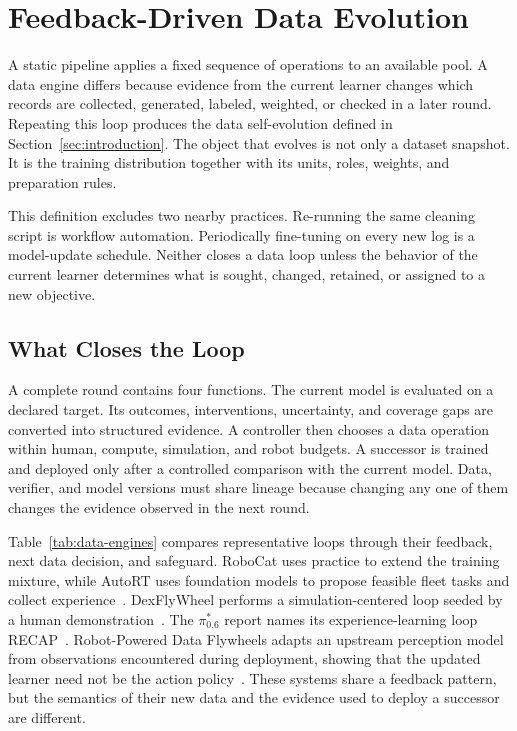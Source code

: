 \section{Feedback-Driven Data Evolution}
\label{sec:data-engines}

A static pipeline applies a fixed sequence of operations to an available pool. A data engine differs because evidence from the current learner changes which records are collected, generated, labeled, weighted, or checked in a later round. Repeating this loop produces the data self-evolution defined in Section~\ref{sec:introduction}. The object that evolves is not only a dataset snapshot. It is the training distribution together with its units, roles, weights, and preparation rules.

This definition excludes two nearby practices. Re-running the same cleaning script is workflow automation. Periodically fine-tuning on every new log is a model-update schedule. Neither closes a data loop unless the behavior of the current learner determines what is sought, changed, retained, or assigned to a new objective.

\subsection{What Closes the Loop}

A complete round contains four functions. The current model is evaluated on a declared target. Its outcomes, interventions, uncertainty, and coverage gaps are converted into structured evidence. A controller then chooses a data operation within human, compute, simulation, and robot budgets. A successor is trained and deployed only after a controlled comparison with the current model. Data, verifier, and model versions must share lineage because changing any one of them changes the evidence observed in the next round.

Table~\ref{tab:data-engines} compares representative loops through their feedback, next data decision, and safeguard. RoboCat uses practice to extend the training mixture, while AutoRT uses foundation models to propose feasible fleet tasks and collect experience~\cite{bousmalis2023robocat_2306_11706,ahn2024autort_2401_12963}. DexFlyWheel performs a simulation-centered loop seeded by a human demonstration~\cite{zhu2025dexflywheel_2509_23829}. The $\pi^{*}_{0.6}$ report names its experience-learning loop RECAP~\cite{intelligence20250_2511_14759}. Robot-Powered Data Flywheels adapts an upstream perception model from observations encountered during deployment, showing that the updated learner need not be the action policy~\cite{grannen2025robot_2511_19647}. These systems share a feedback pattern, but the semantics of their new data and the evidence used to deploy a successor are different.

